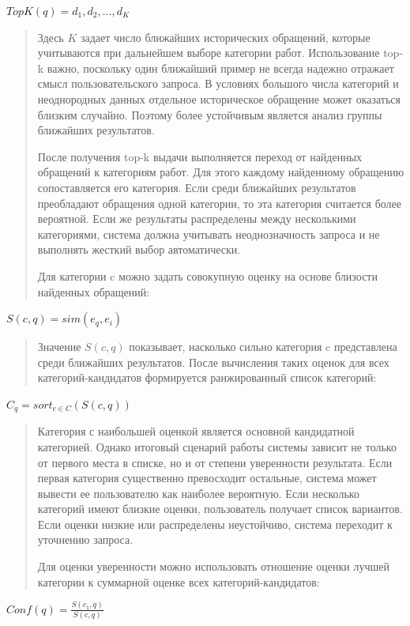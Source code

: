 \(TopK(q) = d_{1},d_{2},...,d_{K}\)

\begin{quote}
Здесь \(K\) задает число ближайших исторических обращений, которые
учитываются при дальнейшем выборе категории работ. Использование top-k
важно, поскольку один ближайший пример не всегда надежно отражает смысл
пользовательского запроса. В условиях большого числа категорий и
неоднородных данных отдельное историческое обращение может оказаться
близким случайно. Поэтому более устойчивым является анализ группы
ближайших результатов.

После получения top-k выдачи выполняется переход от найденных обращений
к категориям работ. Для этого каждому найденному обращению
сопоставляется его категория. Если среди ближайших результатов
преобладают обращения одной категории, то эта категория считается более
вероятной. Если же результаты распределены между несколькими
категориями, система должна учитывать неоднозначность запроса и не
выполнять жесткий выбор автоматически.

Для категории c можно задать совокупную оценку на основе близости
найденных обращений:
\end{quote}

\(S(c,q) = sim\left( e_{q},e_{i} \right)\)

\begin{quote}
Значение \(S(c,q)\) показывает, насколько сильно категория c
представлена среди ближайших результатов. После вычисления таких оценок
для всех категорий-кандидатов формируется ранжированный список
категорий:
\end{quote}

\(C_{q} = sort_{c \in C}\left( S(c,q) \right)\)

\begin{quote}
Категория с наибольшей оценкой является основной кандидатной категорией.
Однако итоговый сценарий работы системы зависит не только от первого
места в списке, но и от степени уверенности результата. Если первая
категория существенно превосходит остальные, система может вывести ее
пользователю как наиболее вероятную. Если несколько категорий имеют
близкие оценки, пользователь получает список вариантов. Если оценки
низкие или распределены неустойчиво, система переходит к уточнению
запроса.

Для оценки уверенности можно использовать отношение оценки лучшей
категории к суммарной оценке всех категорий-кандидатов:
\end{quote}

\(Conf(q) = \frac{S\left( c_{1},q \right)}{S(c,q)}\)

